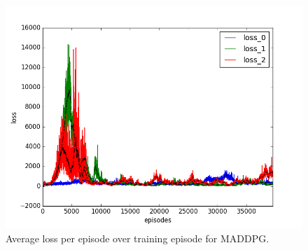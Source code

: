 \begin{figure}[h]
  \centering
  \includegraphics[trim=10 10 10 10,clip,width=\figscale\linewidth]
  {../results/maddpg_2vs1/loss.png}
  \caption{Average loss per episode over training episode for MADDPG.}
  \label{fig:maddpg-2vs1}
\end{figure}
\FloatBarrier

